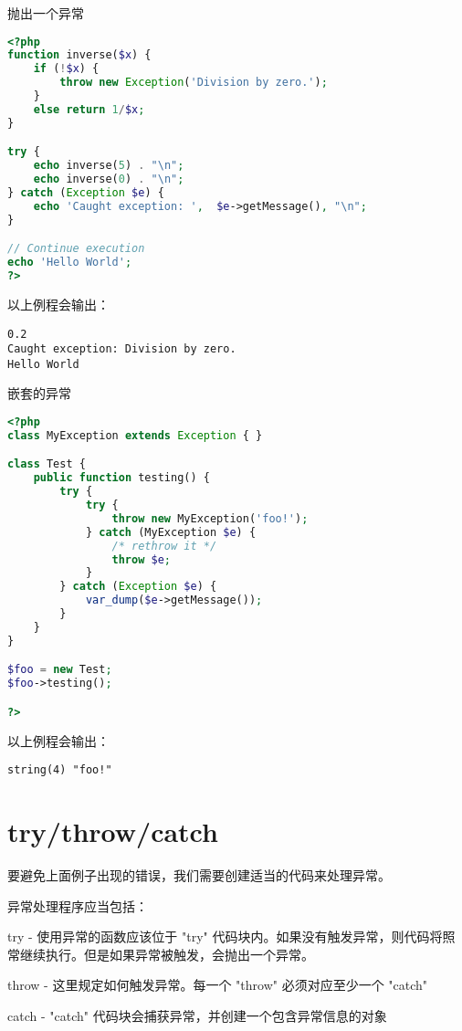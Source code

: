 \begin{example}
抛出一个异常
\begin{lstlisting}[language=PHP]
<?php
function inverse($x) {
    if (!$x) {
        throw new Exception('Division by zero.');
    }
    else return 1/$x;
}

try {
    echo inverse(5) . "\n";
    echo inverse(0) . "\n";
} catch (Exception $e) {
    echo 'Caught exception: ',  $e->getMessage(), "\n";
}

// Continue execution
echo 'Hello World';
?>
\end{lstlisting}
\end{example}

以上例程会输出：

\begin{verbatim}
0.2
Caught exception: Division by zero.
Hello World
\end{verbatim}

\begin{example}
嵌套的异常
\begin{lstlisting}[language=PHP]
<?php
class MyException extends Exception { }

class Test {
    public function testing() {
        try {
            try {
                throw new MyException('foo!');
            } catch (MyException $e) {
                /* rethrow it */
                throw $e;
            }
        } catch (Exception $e) {
            var_dump($e->getMessage());
        }
    }
}

$foo = new Test;
$foo->testing();

?>
\end{lstlisting}
\end{example}

以上例程会输出：

\begin{verbatim}
string(4) "foo!"
\end{verbatim}

\section{try/throw/catch}

要避免上面例子出现的错误，我们需要创建适当的代码来处理异常。




异常处理程序应当包括：



\begin{compactenum}
\item try - 使用异常的函数应该位于 "try" 代码块内。如果没有触发异常，则代码将照常继续执行。但是如果异常被触发，会抛出一个异常。
\item throw - 这里规定如何触发异常。每一个 "throw" 必须对应至少一个 "catch"
\item catch - "catch" 代码块会捕获异常，并创建一个包含异常信息的对象
\end{compactenum}

